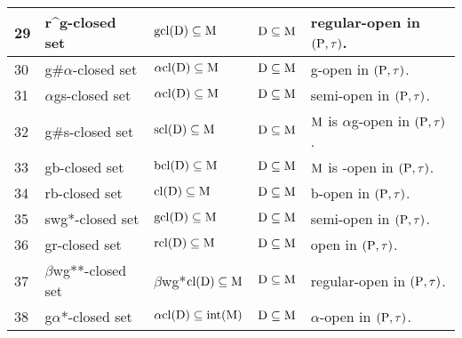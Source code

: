 {\begin{longtable}{@{}|p{.9cm}|>{\raggedright}p{5cm}|>{\centering}p{2.5cm}|>{\centering}p{1.7cm}|>{\centering}p{2.8cm}|@{}}
\hline
29 & r\textasciicircum{g}-closed set \cite{Janaki2} & $\mathrm{gcl}(\mathrm{D}) \subseteq \mathrm{M}$ & $\mathrm{D} \subseteq \mathrm{M}$ & regular-open in $(\mathrm{P}, \tau)$.\tabularnewline
\hline
30 & g\#$\alpha$-closed set \cite{Devi} & $\alpha\mathrm{cl}(\mathrm{D}) \subseteq \mathrm{M}$ & $\mathrm{D}\subseteq\mathrm{M}$ & g-open in $(\mathrm{P}, \tau)$.\tabularnewline
\hline
31 & $\alpha$gs-closed set \cite{Rajamani} & $\alpha\mathrm{cl}(\mathrm{D}) \subseteq \mathrm{M}$ & $\mathrm{D} \subseteq \mathrm{M}$ & semi-open in $(\mathrm{P}, \tau)$.\tabularnewline
\hline
32 & g\#s-closed set \cite{VeeraKumar1} & $\mathrm{scl}(\mathrm{D}) \subseteq \mathrm{M}$ & $\mathrm{D} \subseteq \mathrm{M}$ & $\mathrm{M}$ is $\alpha$g-open in $(\mathrm{P}, \tau)$.\tabularnewline
\hline
33 & gb-closed set \cite{Ahmad} & $\mathrm{bcl}(\mathrm{D}) \subseteq \mathrm{M}$ & $\mathrm{D} \subseteq \mathrm{M}$ & $\mathrm{M}$ is -open in $(\mathrm{P}, \tau)$.\tabularnewline
\hline
34 & rb-closed set \cite{Nagaveni2} & $\mathrm{cl}(\mathrm{D}) \subseteq \mathrm{M}$ & $\mathrm{D} \subseteq \mathrm{M}$ & b-open in $(\mathrm{P}, \tau)$.\tabularnewline
\hline
35 & swg*-closed set \cite{Nagaveni} & $\mathrm{gcl}(\mathrm{D}) \subseteq \mathrm{M}$ & $\mathrm{D} \subseteq \mathrm{M}$ & semi-open in $(\mathrm{P}, \tau)$.\tabularnewline
\hline
36 & gr-closed set \cite{Bhattacharya1} & $\mathrm{rcl}(\mathrm{D}) \subseteq \mathrm{M}$ & $\mathrm{D} \subseteq \mathrm{M}$ & open in $(\mathrm{P}, \tau)$.\tabularnewline
\hline
37 & $\beta$wg{*}{*}-closed set \cite{Subashini} & $\beta$wg*$\mathrm{cl}(\mathrm{D}) \subseteq \mathrm{M}$ & $\mathrm{D} \subseteq \mathrm{M}$ & regular-open in $(\mathrm{P}, \tau)$.\tabularnewline
\hline
38 & g$\alpha$*-closed set \cite{Maki3} & $\alpha\mathrm{cl}(\mathrm{D}) \subseteq\mbox{int}(\mathrm{M})$ & $\mathrm{D} \subseteq \mathrm{M}$ & $\alpha$-open in $(\mathrm{P}, \tau)$.\tabularnewline

\end{longtable}}
